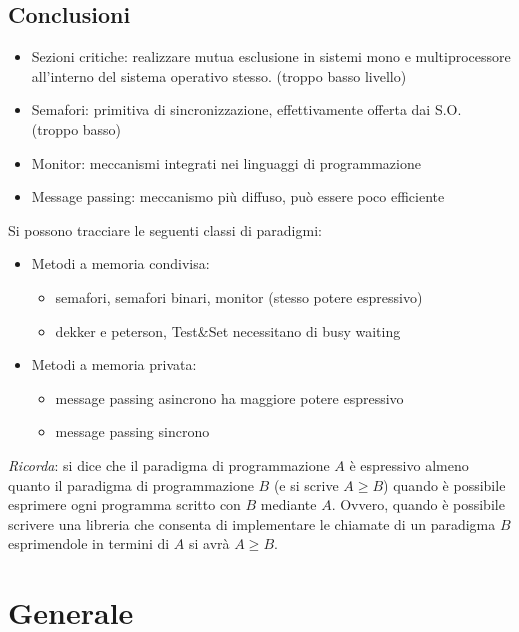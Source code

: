 \documentclass[a4paper,12pt]{article}
\begin{document}
\subsection{Conclusioni}
\begin{itemize}
  \item Sezioni critiche: realizzare mutua esclusione in sistemi mono e multiprocessore all'interno del sistema operativo stesso. (troppo basso livello)
  \item Semafori: primitiva di sincronizzazione, effettivamente offerta dai S.O. (troppo basso)
  \item Monitor: meccanismi integrati nei linguaggi di programmazione
  \item Message passing: meccanismo più diffuso, può essere poco efficiente
\end{itemize}
Si possono tracciare le seguenti classi di paradigmi:
\begin{itemize}
  \item Metodi a memoria condivisa: 
  \begin{itemize}
    \item semafori, semafori binari, monitor (stesso potere espressivo)
    \item dekker e peterson, Test\&Set necessitano di busy waiting
  \end{itemize}
    \item Metodi a memoria privata: 
  \begin{itemize}
    \item message passing asincrono ha maggiore potere espressivo
    \item message passing sincrono
  \end{itemize}
\end{itemize}
\textit{Ricorda}: si dice che il paradigma di programmazione $A$ è espressivo almeno quanto il paradigma di programmazione $B$ (e si scrive $A \geq B$) quando è possibile esprimere ogni programma scritto con $B$ mediante $A$. Ovvero, quando è possibile scrivere una libreria che consenta di implementare le chiamate di un paradigma $B$ esprimendole in termini di $A$ si avrà $A \geq B$.
\pagebreak
\section{Generale}
\end{document}

